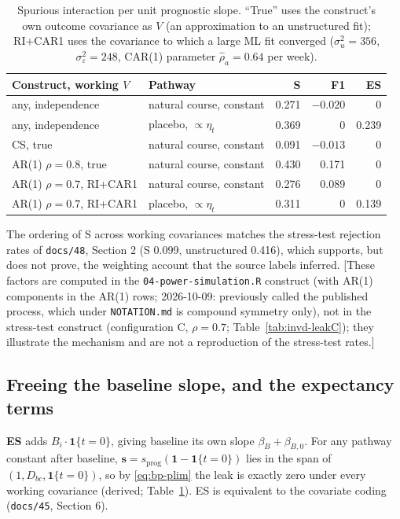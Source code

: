 \documentclass[11pt]{article}
\newcommand{\note}[1]{\textcolor{blue!60!black}{\small [#1]}}
\newcommand{\code}[1]{\texttt{#1}}
\begin{document}
\begin{table}[h]
\centering\small
\caption{Spurious interaction per unit prognostic slope. ``True'' uses
the construct's own outcome covariance as $V$ (an approximation to an
unstructured fit); RI+CAR1 uses the covariance to which a large ML fit
converged ($\sigma_u^2 = 356$, $\sigma_\varepsilon^2 = 248$, CAR(1) parameter
$\hat\rho_a = 0.64$ per week).}
\label{tab:bp-leak}
\begin{tabular}{@{}llrrr@{}}
\toprule
Construct, working $V$ & Pathway & S & F1 & ES \\
\midrule
any, independence & natural course, constant & 0.271 & $-0.020$ & 0 \\
any, independence & placebo, $\propto\eta_t$ & 0.369 & 0 & 0.239 \\
CS, true & natural course, constant & 0.091 & $-0.013$ & 0 \\
AR(1) $\rho = 0.8$, true & natural course, constant & 0.430 & 0.171 & 0 \\
AR(1) $\rho = 0.7$, RI+CAR1 & natural course, constant & 0.276 & 0.089 & 0 \\
AR(1) $\rho = 0.7$, RI+CAR1 & placebo, $\propto\eta_t$ & 0.311 & 0 & 0.139 \\
\bottomrule
\end{tabular}
\end{table}

\noindent The ordering of S across working covariances matches the
stress-test rejection rates of \code{docs/48}, Section 2 (S 0.099,
unstructured 0.416), which supports, but does not prove, the weighting
account that the source labels inferred. \note{These factors are
computed in the \code{04-power-simulation.R} construct (with AR(1)
components in the AR(1) rows; 2026-10-09: previously called the
published process, which under \code{NOTATION.md} is compound symmetry
only), not in the stress-test construct
(configuration C, $\rho = 0.7$; Table~\ref{tab:invd-leakC});
they illustrate the mechanism and are not a reproduction of the
stress-test rates.}

\subsection{Freeing the baseline slope, and the expectancy terms}

\textbf{ES} adds $B_i\cdot\mathbf 1\{t = 0\}$, giving baseline its own
slope $\beta_B + \beta_{B,0}$. For any pathway constant after baseline,
$\mathbf s = s_{\text{prog}}(\mathbf 1 - \mathbf 1\{t = 0\})$ lies in
the span of $(1, D_{bc}, \mathbf 1\{t=0\})$, so by \eqref{eq:bp-plim}
the leak is exactly zero under every working covariance (derived;
Table~\ref{tab:bp-leak}). ES is equivalent to the covariate coding
(\code{docs/45}, Section 6).
\end{document}

